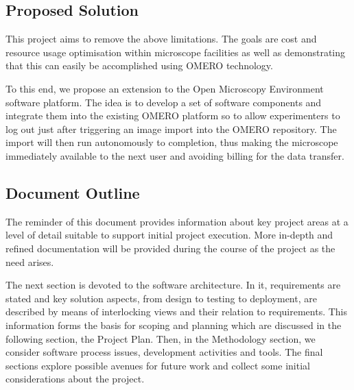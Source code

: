 \subsection{Proposed Solution}
This project aims to remove the above limitations. The goals are cost and resource usage
optimisation within microscope facilities as well as demonstrating that this can easily
be accomplished using OMERO technology.

To this end, we propose an extension to the Open Microscopy Environment software 
platform\cite{ome:www}. The idea is to develop a set of software components and 
integrate them into the existing OMERO platform so to allow experimenters to log 
out just after triggering an image import into the OMERO repository. The import 
will then run autonomously to completion, thus making the microscope immediately
available to the next user and avoiding billing for the data transfer.


\subsection{Document Outline}
The reminder of this document provides information about key project areas at a level
of detail suitable to support initial project execution. More in-depth and refined 
documentation will be provided during the course of the project as the need arises.

The next section is devoted to the software architecture. In it, requirements are
stated and key solution aspects, from design to testing to deployment, are described
by means of interlocking views and their relation to requirements.
This information forms the basis for scoping and planning which are discussed in the
following section, the Project Plan. 
Then, in the Methodology section, we consider software process issues, development
activities and tools.
The final sections explore possible avenues for future work and collect some initial
considerations about the project.
